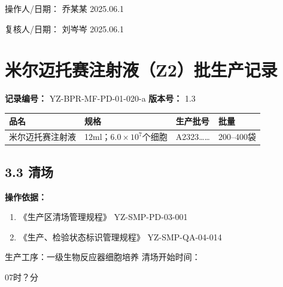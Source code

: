 \documentclass[UTF8,10pt,a4paper,fontset=fandol]{ctexart}
\newcommand{\fieldvalue}[1]{#1}
\newcommand{\handwritten}[1]{#1}
\begin{document}
\vspace{4pt}

操作人/日期：
\fieldvalue{\handwritten{乔某某}}
\quad
\fieldvalue{\handwritten{2025.06.1}}

\hfill
复核人/日期：
\fieldvalue{\handwritten{刘岑岑}}
\quad
\fieldvalue{\handwritten{2025.06.1}}

\newpage

\section*{米尔迈托赛注射液（Z2）批生产记录}

\noindent
\textbf{记录编号：} YZ-BPR-MF-PD-01-020-a \qquad
\textbf{版本号：} 1.3

\begin{tabularx}{\textwidth}{|X|X|X|X|}
\hline
品名 & 规格 & 生产批号 & 批量 \\ \hline
米尔迈托赛注射液 & 12ml；$6.0\times10^7$个细胞 &
\fieldvalue{\handwritten{A2323……}} &
200--400袋 \\ \hline
\end{tabularx}

\subsection*{3.3 清场}

\noindent
\textbf{操作依据：}

\begin{enumerate}
\item 《生产区清场管理规程》 \hfill YZ-SMP-PD-03-001
\item 《生产、检验状态标识管理规程》 \hfill YZ-SMP-QA-04-014
\end{enumerate}

\noindent
生产工序：一级生物反应器细胞培养 \hfill 清场开始时间：

\fieldvalue{\handwritten{07时？分}}
\end{document}
